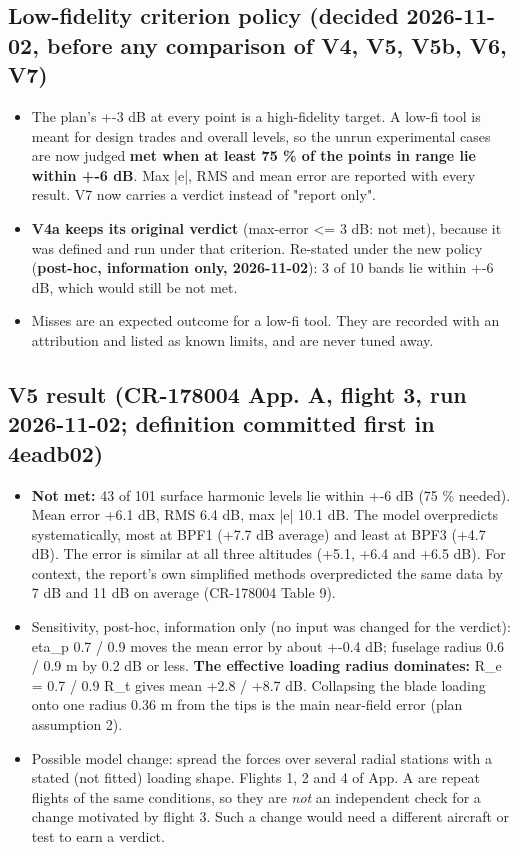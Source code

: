 \documentclass[10pt,a4paper]{article}
\begin{document}
\subsection*{Low-fidelity criterion policy (decided 2026-11-02, before any comparison of V4, V5, V5b, V6, V7)}

\begin{itemize}
\item The plan's +-3 dB at every point is a high-fidelity target. A low-fi tool is meant for design trades and overall levels, so the unrun experimental cases are now judged \textbf{met when at least 75 \% of the points in range lie within +-6 dB}. Max |e|, RMS and mean error are reported with every result. V7 now carries a verdict instead of "report only".
\item \textbf{V4a keeps its original verdict} (max-error <= 3 dB: not met), because it was defined and run under that criterion. Re-stated under the new policy (\textbf{post-hoc, information only, 2026-11-02}): 3 of 10 bands lie within +-6 dB, which would still be not met.
\item Misses are an expected outcome for a low-fi tool. They are recorded with an attribution and listed as known limits, and are never tuned away.
\end{itemize}

\subsection*{V5 result (CR-178004 App. A, flight 3, run 2026-11-02; definition committed first in 4eadb02)}

\begin{itemize}
\item \textbf{Not met:} 43 of 101 surface harmonic levels lie within +-6 dB (75 \% needed). Mean error +6.1 dB, RMS 6.4 dB, max |e| 10.1 dB. The model overpredicts systematically, most at BPF1 (+7.7 dB average) and least at BPF3 (+4.7 dB). The error is similar at all three altitudes (+5.1, +6.4 and +6.5 dB). For context, the report's own simplified methods overpredicted the same data by 7 dB and 11 dB on average (CR-178004 Table 9).
\item Sensitivity, post-hoc, information only (no input was changed for the verdict): eta\_p 0.7 / 0.9 moves the mean error by about +-0.4 dB; fuselage radius 0.6 / 0.9 m by 0.2 dB or less. \textbf{The effective loading radius dominates:} R\_e = 0.7 / 0.9 R\_t gives mean +2.8 / +8.7 dB. Collapsing the blade loading onto one radius 0.36 m from the tips is the main near-field error (plan assumption 2).
\item Possible model change: spread the forces over several radial stations with a stated (not fitted) loading shape. Flights 1, 2 and 4 of App. A are repeat flights of the same conditions, so they are \emph{not} an independent check for a change motivated by flight 3. Such a change would need a different aircraft or test to earn a verdict.
\end{itemize}
\end{document}
